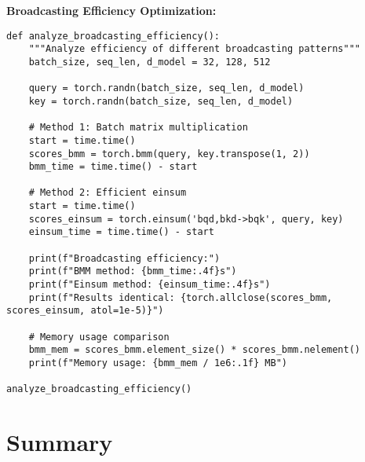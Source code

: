 \documentclass[11pt,a4paper]{book}
\begin{document}
\textbf{Broadcasting Efficiency Optimization:}
\begin{verbatim}
def analyze_broadcasting_efficiency():
    """Analyze efficiency of different broadcasting patterns"""
    batch_size, seq_len, d_model = 32, 128, 512
    
    query = torch.randn(batch_size, seq_len, d_model)
    key = torch.randn(batch_size, seq_len, d_model)
    
    # Method 1: Batch matrix multiplication
    start = time.time()
    scores_bmm = torch.bmm(query, key.transpose(1, 2))
    bmm_time = time.time() - start
    
    # Method 2: Efficient einsum
    start = time.time()
    scores_einsum = torch.einsum('bqd,bkd->bqk', query, key)
    einsum_time = time.time() - start
    
    print(f"Broadcasting efficiency:")
    print(f"BMM method: {bmm_time:.4f}s")
    print(f"Einsum method: {einsum_time:.4f}s")
    print(f"Results identical: {torch.allclose(scores_bmm, scores_einsum, atol=1e-5)}")
    
    # Memory usage comparison
    bmm_mem = scores_bmm.element_size() * scores_bmm.nelement()
    print(f"Memory usage: {bmm_mem / 1e6:.1f} MB")

analyze_broadcasting_efficiency()
\end{verbatim}

\section{Summary}
\end{document}
